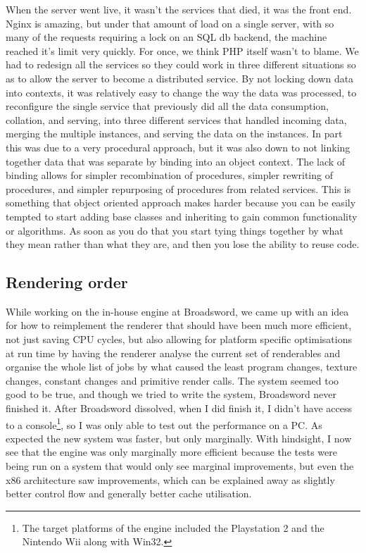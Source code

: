 When the server went live, it wasn't the services that died, it was the front
end. Nginx is amazing, but under that amount of load on a single server, with
so many of the requests requiring a lock on an SQL db backend, the machine
reached it's limit very quickly. For once, we think PHP itself wasn't to blame.
We had to redesign all the services so they could work in three different
situations so as to allow the server to become a distributed service. By not
locking down data into contexts, it was relatively easy to change the way the
data was processed, to reconfigure the single service that previously did all
the data consumption, collation, and serving, into three different services
that handled incoming data, merging the multiple instances, and serving the
data on the instances. In part this was due to a very procedural approach, but
it was also down to not linking together data that was separate by binding into
an object context. The lack of binding allows for simpler recombination of
procedures, simpler rewriting of procedures, and simpler repurposing of
procedures from related services. This is something that object oriented
approach makes harder because you can be easily tempted to start adding base
classes and inheriting to gain common functionality or algorithms. As soon as
you do that you start tying things together by what they mean rather than what
they are, and then you lose the ability to reuse code.

\subsection{Rendering order}

While working on the in-house engine at Broadsword, we came up with an idea for
how to reimplement the renderer that should have been much more efficient, not
just saving CPU cycles, but also allowing for platform specific optimisations
at run time by having the renderer analyse the current set of renderables and
organise the whole list of jobs by what caused the least program changes,
texture changes, constant changes and primitive render calls. The system seemed
too good to be true, and though we tried to write the system, Broadsword never
finished it. After Broadsword dissolved, when I did finish it, I didn't have
access to a console\footnote{The target platforms of the engine included the
Playstation 2 and the Nintendo Wii along with Win32.}, so I was only able to
test out the performance on a PC.  As expected the new system was faster, but
only marginally. With hindsight, I now see that the engine was only marginally
more efficient because the tests were being run on a system that would only see
marginal improvements, but even the x86 architecture saw improvements, which
can be explained away as slightly better control flow and generally better
cache utilisation.

